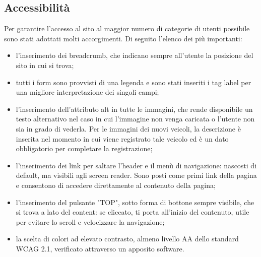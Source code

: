    \subsection{Accessibilità}
    Per garantire l'accesso al sito al maggior numero di categorie di utenti possibile sono stati adottati molti accorgimenti. Di seguito l'elenco dei più importanti:
    \begin{itemize}
        \item l'inserimento dei breadcrumb, che indicano sempre all'utente la posizione del sito in cui si trova;
        \item tutti i form sono provvisti di una legenda e sono stati inseriti i tag label per una migliore interpretazione dei singoli campi;
        \item l'inserimento dell'attributo alt in tutte le immagini, che rende disponibile un testo alternativo nel caso in cui l’immagine non venga caricata o l'utente non sia in grado di vederla. Per le immagini dei nuovi veicoli, la descrizione è inserita nel momento in cui viene registrato tale veicolo ed è un dato obbligatorio per completare la registrazione;
        \item l'inserimento dei link per saltare l'header e il menù di navigazione: nascosti di default, ma visibili agli screen reader. Sono posti come primi link della pagina e consentono di accedere direttamente al contenuto della pagina;
        \item l'inserimento del pulsante "TOP", sotto forma di bottone sempre visibile, che si trova a lato del content: se cliccato, ti porta all’inizio del contenuto, utile per evitare lo scroll e velocizzare la navigazione;
        \item la scelta di colori ad elevato contrasto, almeno livello AA dello standard WCAG 2.1, verificato attraverso un apposito software.
    \end{itemize}
\pagebreak